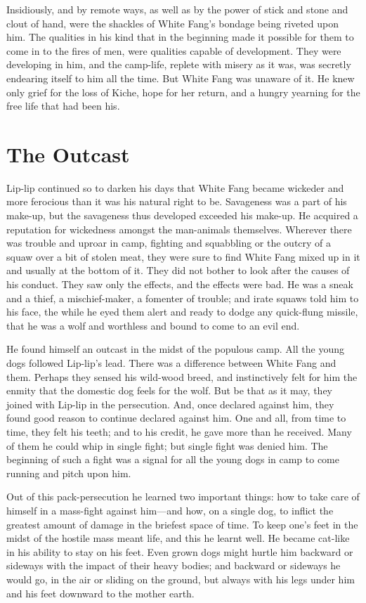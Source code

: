 \documentclass[10pt]{book}
\begin{document}
Insidiously, and by remote ways, as well as by the power of stick and
stone and clout of hand, were the shackles of White Fang’s bondage
being riveted upon him. The qualities in his kind that in the beginning
made it possible for them to come in to the fires of men, were
qualities capable of development. They were developing in him, and the
camp-life, replete with misery as it was, was secretly endearing itself
to him all the time. But White Fang was unaware of it. He knew only
grief for the loss of Kiche, hope for her return, and a hungry yearning
for the free life that had been his.

\chapter{The Outcast}

Lip-lip continued so to darken his days that White Fang became wickeder
and more ferocious than it was his natural right to be. Savageness was
a part of his make-up, but the savageness thus developed exceeded his
make-up. He acquired a reputation for wickedness amongst the
man-animals themselves. Wherever there was trouble and uproar in camp,
fighting and squabbling or the outcry of a squaw over a bit of stolen
meat, they were sure to find White Fang mixed up in it and usually at
the bottom of it. They did not bother to look after the causes of his
conduct. They saw only the effects, and the effects were bad. He was a
sneak and a thief, a mischief-maker, a fomenter of trouble; and irate
squaws told him to his face, the while he eyed them alert and ready to
dodge any quick-flung missile, that he was a wolf and worthless and
bound to come to an evil end.

He found himself an outcast in the midst of the populous camp. All the
young dogs followed Lip-lip’s lead. There was a difference between
White Fang and them. Perhaps they sensed his wild-wood breed, and
instinctively felt for him the enmity that the domestic dog feels for
the wolf. But be that as it may, they joined with Lip-lip in the
persecution. And, once declared against him, they found good reason to
continue declared against him. One and all, from time to time, they
felt his teeth; and to his credit, he gave more than he received. Many
of them he could whip in single fight; but single fight was denied him.
The beginning of such a fight was a signal for all the young dogs in
camp to come running and pitch upon him.

Out of this pack-persecution he learned two important things: how to
take care of himself in a mass-fight against him—and how, on a single
dog, to inflict the greatest amount of damage in the briefest space of
time. To keep one’s feet in the midst of the hostile mass meant life,
and this he learnt well. He became cat-like in his ability to stay on
his feet. Even grown dogs might hurtle him backward or sideways with
the impact of their heavy bodies; and backward or sideways he would go,
in the air or sliding on the ground, but always with his legs under him
and his feet downward to the mother earth.
\end{document}
